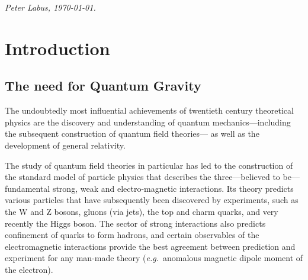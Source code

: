 \documentclass[11pt]{book}
\newcommand\eg{\textit{e.g.}\ }
\numberwithin{equation}{chapter}
\begin{document}
\begin{flushright}
  \textit{Peter Labus, \monthyeardate\today.}
\end{flushright}

\makeatletter
\@openrighttrue
\makeatother


\pagestyle{empty} %

\tableofcontents %

\pagestyle{fancy} %



\chapter*{Introduction}

\section*{The need for Quantum Gravity}


The undoubtedly most influential achievements of twentieth century theoretical physics
are the discovery and understanding of
quantum mechanics---including the subsequent construction of quantum field theories---%
as well as the development of general relativity.

The study of quantum field theories in particular has led to the construction
of the standard model of particle physics that describes the three---believed to be---fundamental
strong, weak and electro-magnetic interactions.
Its theory predicts various particles
that have subsequently been discovered by experiments,
such as the W and Z bosons, gluons (via jets), the top and charm quarks, and very recently the Higgs boson.
The sector of strong interactions also predicts confinement of quarks to form hadrons, and
certain observables of the electromagnetic interactions provide the best agreement between
prediction and experiment for any man-made theory (\eg anomalous magnetic dipole moment of the electron).
\end{document}
